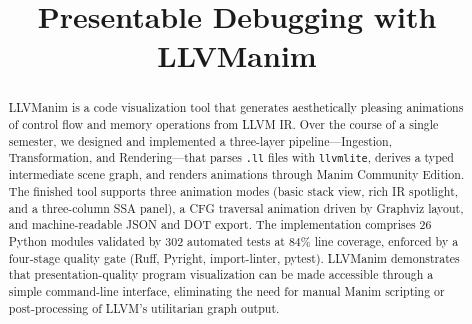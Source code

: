\documentclass[conference]{IEEEtran}
\begin{document}
\title{Presentable Debugging with LLVManim}
\thispagestyle{plain}
\pagestyle{plain}

\author{
\and
{}
\and
{}
\and
{}
}

\maketitle

\begin{abstract}
LLVManim is a code visualization tool that generates aesthetically pleasing animations of control flow and memory operations from LLVM IR. Over the course of a single semester, we designed and implemented a three-layer pipeline---Ingestion, Transformation, and Rendering---that parses \texttt{.ll} files with \texttt{llvmlite}, derives a typed intermediate scene graph, and renders animations through Manim Community Edition. The finished tool supports three animation modes (basic stack view, rich IR spotlight, and a three-column SSA panel), a CFG traversal animation driven by Graphviz layout, and machine-readable JSON and DOT export. The implementation comprises 26 Python modules validated by 302 automated tests at 84\% line coverage, enforced by a four-stage quality gate (Ruff, Pyright, import-linter, pytest). LLVManim demonstrates that presentation-quality program visualization can be made accessible through a simple command-line interface, eliminating the need for manual Manim scripting or post-processing of LLVM's utilitarian graph output.
\end{abstract}
\end{document}
